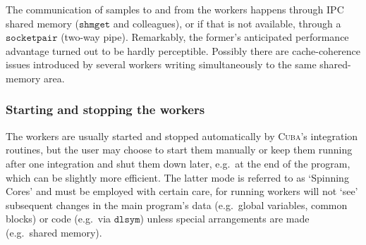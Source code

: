 \documentclass[12pt]{article}
\newcommand\cuba{\textsc{Cuba}}
\newcommand\eg{e.g.\ }
\newcommand\Code[1]{\ensuremath{\texttt{#1}}}
\begin{document}
The communication of samples to and from the workers happens through IPC 
shared memory (\Code{shmget} and colleagues), or if that is not 
available, through a \Code{socketpair} (two-way pipe).  Remarkably, the 
former's anticipated performance advantage turned out to be hardly 
perceptible.  Possibly there are cache-coherence issues introduced by 
several workers writing simultaneously to the same shared-memory area.


\subsubsection{Starting and stopping the workers}
\label{sect:spinning}

The workers are usually started and stopped automatically by \cuba's 
integration routines, but the user may choose to start them manually or 
keep them running after one integration and shut them down later, \eg at 
the end of the program, which can be slightly more efficient.  The 
latter mode is referred to as `Spinning Cores' and must be employed with 
certain care, for running workers will not `see' subsequent changes in 
the main program's data (\eg global variables, common blocks) or code 
(\eg via \Code{dlsym}) unless special arrangements are made (\eg shared 
memory).
\end{document}
